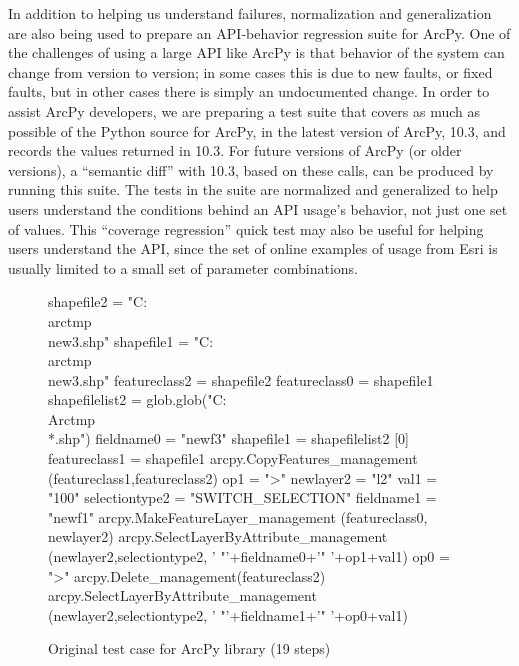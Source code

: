 In addition to helping us understand failures, normalization and
generalization are also being used to prepare an API-behavior
regression suite for ArcPy.  One of the challenges of using a large
API like ArcPy is that behavior of the system can change from version
to version; in some cases this is due to new faults, or fixed faults,
but in other cases there is simply an undocumented change.  In order
to assist ArcPy developers, we are preparing a test suite that covers
as much as possible of the Python source for ArcPy, in the latest version of ArcPy,
10.3, and records the values returned in 10.3.  For future versions of
ArcPy (or older versions), a ``semantic diff'' with 10.3, based on
these calls, can be produced by running this suite.  The tests in the
suite are normalized and generalized to help users understand the
conditions behind an API usage's behavior, not just one set of
values.  This ``coverage regression'' quick test \cite{icst2014} may
also be useful for helping users understand the API, since the set of
online examples of usage from Esri is usually limited to a small set
of parameter combinations.

\begin{figure}
{\scriptsize 
\begin{code}
shapefile2 = "C:\\arctmp\\new3.shp" 
shapefile1 = "C:\\arctmp\\new3.shp" 
featureclass2 = shapefile2 
featureclass0 = shapefile1 
shapefilelist2 = 
   glob.glob("C:\\Arctmp\\*.shp") 
fieldname0 = "newf3" 
shapefile1 = shapefilelist2 [0] 
featureclass1 = shapefile1 
arcpy.CopyFeatures\_management
   (featureclass1,featureclass2) 
op1 = ">" 
newlayer2 = "l2" 
val1 = "100" 
selectiontype2 = "SWITCH\_SELECTION" 
fieldname1 = "newf1" 
arcpy.MakeFeatureLayer\_management
   (featureclass0, newlayer2) 
arcpy.SelectLayerByAttribute\_management
   (newlayer2,selectiontype2,
   ' "'+fieldname0+'" '+op1+val1) 
op0 = ">" 
arcpy.Delete\_management(featureclass2) 
arcpy.SelectLayerByAttribute\_management
   (newlayer2,selectiontype2,
   ' "'+fieldname1+'" '+op0+val1) 
\end{code}
}
\caption{Original test case for ArcPy library (19 steps)}
\label{esriorig}
\end{figure}

